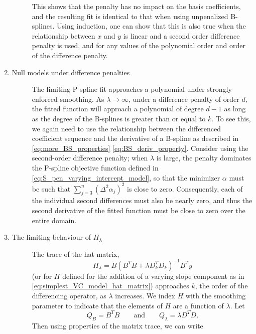 \documentclass[12pt]{article}
\theoremstyle{definition}
\begin{document}
\begin{enumerate}
\begin{description}
This shows that the penalty has no impact on the basis coefficients, and the resulting fit is identical to that when using unpenalized B-splines. Using induction, one can show that this is also true when the relationship between $x$ and $y$ is linear and a second order difference penalty is used, and for any values of the polynomial order and order of the difference penalty.\end{description}
\item \begin{description}\item[Null models under difference penalties] \label{eq:PS_property_3}
The limiting P-spline fit approaches a polynomial under strongly enforced smoothing. As $\lambda \rightarrow \infty$, under a difference penalty of order $d$, the fitted function will approach a polynomial of degree $d-1$ as long as the degree of the B-splines is greater than or equal to $k$. To see this, we again need to use the relationship between the differenced coefficient sequence and the derivative of a B-spline as described in \ref{eq:more_BS_properties} \ref{eq:BS_deriv_property}. Consider using the second-order difference penalty; when $\lambda$ is large, the penalty dominates the P-spline objective function defined in \ref{eq:S_pen_varying_intercept_model}, so that the minimizer $\alpha$ must be such that $\sum_{j=3}^n\left(\Delta^2\alpha_j\right)^2$ is close to zero. Consequently, each of the individual second differences must also be nearly zero, and thus the second derivative of the fitted function must be close to zero over the entire domain.
\end{description}
\item \begin{description}\item[The limiting behaviour of $H_\lambda$] The trace of the hat matrix, 
\[
H_\lambda = B\left(B^TB + \lambda D_k^TD_k\right)^{-1}B^Ty
\] 
(or for $H$ defined for the addition of a varying slope component as in \ref{eq:simplest_VC_model_hat_matrix}) approaches $k$, the order of the differencing operator, as $\lambda$ increases. We index $H$ with the smoothing parameter to indicate that the elements of $H$ are a function of $\lambda$. Let
\begin{equation}
Q_B = B^T B \qquad \mbox{and} \qquad Q_\lambda = \lambda D^T D.
\end{equation}
Then using properties of the matrix trace, we can write
\begin{align}
\begin{split}

\end{split}
\end{align}
\end{description}
\end{enumerate}
\end{document}
